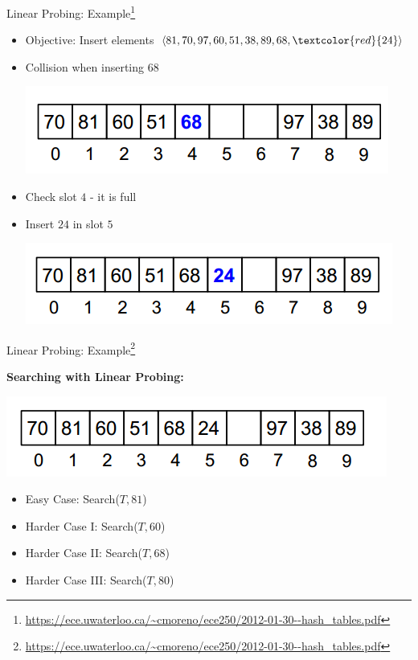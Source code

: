 \documentclass{beamer}
\begin{document}
\begin{frame}{Linear Probing: Example\footnote{\url{https://ece.uwaterloo.ca/~cmoreno/ece250/2012-01-30--hash_tables.pdf}}}
    \begin{itemize}
        \item Objective: Insert elements $\langle 81, 70, 97, 60, 51, 38, 89, 68, \textcolor{red}{24} \rangle$ 
        \item Collision when inserting $68$ 
        \begin{center}
            \includegraphics[scale=0.5]{linearProbing6.png} \pause
        \end{center}
        \item Check slot $4$ - it is full \pause
        \item Insert $24$ in slot $5$
        \begin{center}
            \includegraphics[scale=0.5]{linearProbing7.png}
        \end{center}
    \end{itemize}
\end{frame}


\begin{frame}{Linear Probing: Example\footnote{\url{https://ece.uwaterloo.ca/~cmoreno/ece250/2012-01-30--hash_tables.pdf}}}
        
       {\bf Searching with Linear Probing:}
        \begin{center}
            \includegraphics[scale=0.5]{linearProbing8.png} 
        \end{center}

    \begin{itemize}
        \item Easy Case: Search($T, 81$) 
        \item Harder Case I: Search($T, 60$) 
        \item Harder Case II: Search($T, 68$) 
        \item Harder Case III: Search($T, 80$)
    \end{itemize}
\end{frame}
\end{document}
